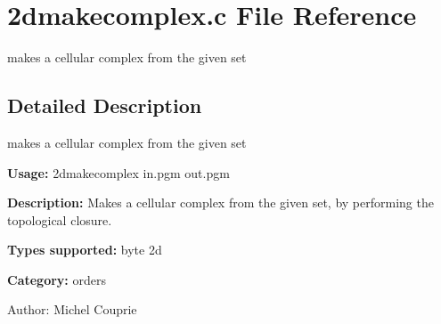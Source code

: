 \section{2dmakecomplex.c File Reference}
\label{2dmakecomplex_8c}
makes a cellular complex from the given set 



\subsection{Detailed Description}
makes a cellular complex from the given set 

{\bf Usage:} 2dmakecomplex in.pgm out.pgm

{\bf Description:} Makes a cellular complex from the given set, by performing the topological closure.

{\bf Types supported:} byte 2d

{\bf Category:} orders

\begin{Desc}
\item[Author:]Michel Couprie \end{Desc}
